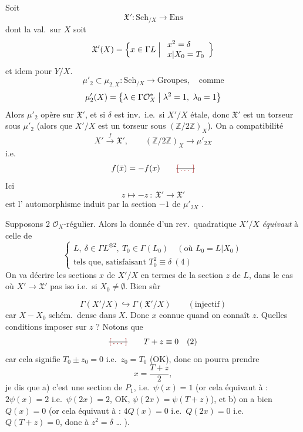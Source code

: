 \documentclass[11pt,a4paper]{article}
\begin{document}
Soit
\[
  \mathfrak{X}' : \mathrm{Sch}_{/X} \to \mathrm{Ens}
\]
dont la val.\ sur $X$ soit
\[
  \mathfrak{X}'(X) = \Bigl\{ x \in \Gamma L \Bigm| \begin{array}{l} x^{2} = \delta \\ x|X_{0} = T_{0} \end{array} \Bigr\}
\]
et idem pour $Y/X$.
\[
  \mu'_{2} \subset \mu_{2,X} : \mathrm{Sch}_{/X} \to \mathrm{Groupes}, \quad\text{comme}
\]
\[
  \mu'_{2}(X) = \bigl\{ \lambda \in \Gamma \mathcal{O}_{X}^{*} \bigm| \lambda^{2} = 1,\ \lambda_{0} = 1 \bigr\}
\]
Alors $\mu'_{2}$ opère sur $\mathfrak{X}'$, et si $\delta$ est inv.\ i.e.\ si $X'/X$ étale, donc $\mathfrak{X}'$ est un torseur sous $\mu'_{2}$ (alors que $X'/X$ est un torseur sous $(\mathbb{Z}/2\mathbb{Z})_{X}$). On a compatibilité
\[
  X' \xrightarrow{\ f\ } \mathfrak{X}', \qquad (\mathbb{Z}/2\mathbb{Z})_{X} \longrightarrow \mu'_{2X}
\]
i.e.
\[
  f(\bar{x}) = -f(x) \qquad \text{\struck{\ill{}}}
\]
Ici
\[
  z \longmapsto -z \ : \ \mathfrak{X}' \to \mathfrak{X}'
\]
est l' automorphisme induit par la section $-1$ de $\mu'_{2X}$ \struck{\ill{}}.

Supposons 2 $\mathcal{O}_{X}$-régulier. Alors la donnée d'un rev.\ quadratique $X'/X$ \emph{équivaut} à celle de
\[
  \left\{\begin{array}{l}
    L,\ \delta \in \Gamma L^{\otimes 2},\ T_{0} \in \Gamma(L_{0}) \quad (\text{où } L_{0} = L|X_{0})\\
    \text{tels que, satisfaisant } T_{0}^{2} \equiv \delta \ (4)
  \end{array}\right.
\]
On va décrire les sections $x$ de $X'/X$ en termes de la section $z$ de $L$, dans le cas où $X' \to \mathfrak{X}'$ pas iso i.e.\ si $X_{0} \neq \emptyset$.  Bien sûr 

\[
  \Gamma(X'/X) \hookrightarrow \Gamma(\mathfrak{X}'/X) \qquad (\text{injectif})
\]
car $X - X_{0}$ schém.\ dense dans $X$. Donc $x$ connue quand on connaît $z$. Quelles conditions imposer sur $z$ ?  Notons que
\[
  \text{\struck{\ill{}}} \qquad T + z \equiv 0 \quad (2)
\]
car cela signifie $T_{0} \pm z_{0} = 0$ i.e.\ $z_{0} = T_{0}$ (OK), donc on pourra prendre
\[
  x = \frac{T + z}{2},
\]
je dis que a) c'est une section de $P_{1}$, i.e.\ $\psi(x) = 1$ (or cela équivaut à : $2\psi(x) = 2$ i.e.\ $\psi(2x) = 2$, OK, $\psi(2x) = \psi(T + z)$), et b) on a bien $Q(x) = 0$ (or cela équivaut à : $4Q(x) = 0$ i.e.\ $Q(2x) = 0$ i.e.\ $Q(T + z) = 0$, donc à $z^{2} = \delta$ … ).
\end{document}
